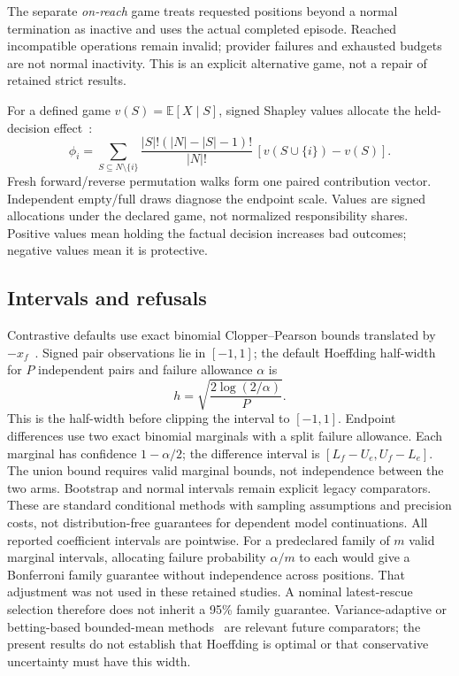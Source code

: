 \documentclass[conference]{IEEEtran}
\begin{document}
The separate \emph{on-reach} game treats requested positions beyond a normal
termination as inactive and uses the actual completed episode. Reached
incompatible operations remain invalid; provider failures and exhausted budgets
are not normal inactivity. This is an explicit alternative game, not a repair
of retained strict results.

For a defined game $v(S)=\mathbb{E}[X\mid S]$, signed Shapley values allocate
the held-decision effect~\cite{shapley}:
\begin{equation}
\phi_i = \sum_{S\subseteq N\setminus\{i\}}
\frac{|S|!(|N|-|S|-1)!}{|N|!}\,[v(S\cup\{i\})-v(S)].
\end{equation}
Fresh forward/reverse permutation walks form one paired contribution vector.
Independent empty/full draws diagnose the endpoint scale. Values are signed
allocations under the declared game, not normalized responsibility shares.
Positive values mean holding the factual decision increases bad outcomes;
negative values mean it is protective.

\subsection{Intervals and refusals}
Contrastive defaults use exact binomial Clopper--Pearson bounds translated by
$-x_f$~\cite{clopperpearson}. Signed pair observations lie in $[-1,1]$; the default
Hoeffding half-width for $P$ independent pairs and failure allowance $\alpha$
is~\cite{hoeffding}
\begin{equation}
h=\sqrt{\frac{2\log(2/\alpha)}{P}}.
\end{equation}
This is the half-width before clipping the interval to $[-1,1]$.
Endpoint differences use two exact binomial marginals with a split failure
allowance. Each marginal has confidence $1-\alpha/2$; the difference interval
is $[L_f-U_e,U_f-L_e]$. The union bound requires valid marginal bounds, not
independence between the two arms. Bootstrap and normal intervals remain
explicit legacy comparators.
These are standard conditional methods with sampling assumptions and precision
costs, not distribution-free guarantees for dependent model continuations.
All reported coefficient intervals are pointwise. For a predeclared family
of $m$ valid marginal intervals, allocating failure probability $\alpha/m$ to
each would give a Bonferroni family guarantee without independence across
positions. That adjustment was not used in these retained studies. A nominal
latest-rescue selection therefore does not inherit a 95\% family guarantee.
Variance-adaptive or betting-based bounded-mean methods~\cite{betting} are
relevant future comparators; the present results do not establish that
Hoeffding is optimal or that conservative uncertainty must have this width.
\end{document}
